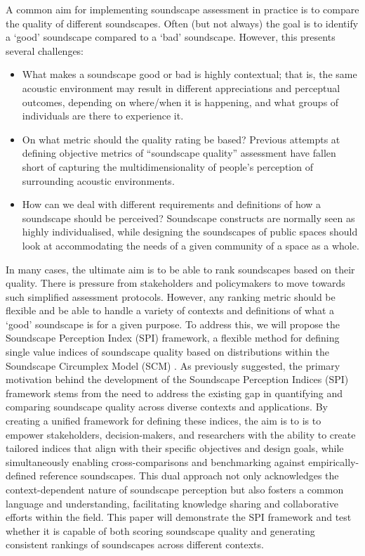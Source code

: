 \documentclass[
  authoryear,
  3p]{elsarticle}
\providecommand{\tightlist}{%
  \setlength{\itemsep}{0pt}\setlength{\parskip}{0pt}}\usepackage{longtable,booktabs,array}
\begin{document}
A common aim for implementing soundscape assessment in practice is to
compare the quality of different soundscapes. Often (but not always) the
goal is to identify a `good' soundscape compared to a `bad' soundscape.
However, this presents several challenges:

\begin{itemize}
\tightlist
\item
  What makes a soundscape good or bad is highly contextual; that is, the
  same acoustic environment may result in different appreciations and
  perceptual outcomes, depending on where/when it is happening, and what
  groups of individuals are there to experience it.
\item
  On what metric should the quality rating be based? Previous attempts
  at defining objective metrics of ``soundscape quality'' assessment
  have fallen short of capturing the multidimensionality of people's
  perception of surrounding acoustic environments.
\item
  How can we deal with different requirements and definitions of how a
  soundscape should be perceived? Soundscape constructs are normally
  seen as highly individualised, while designing the soundscapes of
  public spaces should look at accommodating the needs of a given
  community of a space as a whole.
\end{itemize}

In many cases, the ultimate aim is to be able to rank soundscapes based
on their quality. There is pressure from stakeholders and policymakers
to move towards such simplified assessment protocols. However, any
ranking metric should be flexible and be able to handle a variety of
contexts and definitions of what a `good' soundscape is for a given
purpose. To address this, we will propose the Soundscape Perception
Index (SPI) framework, a flexible method for defining single value
indices of soundscape quality based on distributions within the
Soundscape Circumplex Model (SCM)
\citep{Axelsson2012Swedish, Mitchell2022How, Axelsson2010principal}. As
previously suggested, the primary motivation behind the development of
the Soundscape Perception Indices (SPI) framework stems from the need to
address the existing gap in quantifying and comparing soundscape quality
across diverse contexts and applications. By creating a unified
framework for defining these indices, the aim is to is to empower
stakeholders, decision-makers, and researchers with the ability to
create tailored indices that align with their specific objectives and
design goals, while simultaneously enabling cross-comparisons and
benchmarking against empirically-defined reference soundscapes. This
dual approach not only acknowledges the context-dependent nature of
soundscape perception but also fosters a common language and
understanding, facilitating knowledge sharing and collaborative efforts
within the field. This paper will demonstrate the SPI framework and test
whether it is capable of both scoring soundscape quality and generating
consistent rankings of soundscapes across different contexts.
\end{document}
